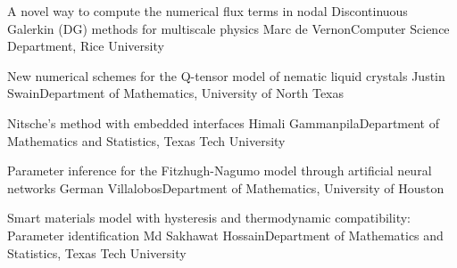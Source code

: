\begin{postersPG}
\item\poster %
{A novel way to compute the numerical flux terms in nodal Discontinuous Galerkin (DG) methods for multiscale physics}
{Marc de Vernon}{Computer Science Department, Rice University}

\item\poster %
{New numerical schemes for the Q-tensor model of nematic liquid crystals}
{Justin Swain}{Department of Mathematics, University of North Texas}

\item\poster %
{Nitsche’s method with embedded interfaces}
{Himali Gammanpila}{Department of Mathematics and Statistics, Texas Tech University}

\item\poster %
{Parameter inference for the Fitzhugh-Nagumo model through artificial neural networks}
{German Villalobos}{Department of Mathematics, University of Houston}

\item\poster %
{Smart materials model with hysteresis and thermodynamic compatibility: Parameter identification}
{Md Sakhawat Hossain}{Department of Mathematics and Statistics, Texas Tech University}

\end{postersPG}

\room


